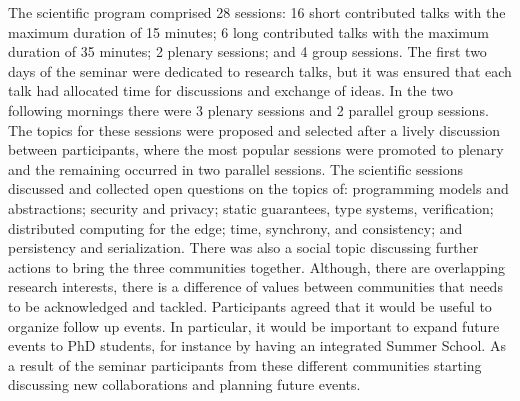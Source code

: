 \documentclass[a4paper,UKenglish]{dagrep-v2018}
\begin{document}
The scientific program comprised 28 sessions: 16 short contributed talks with the maximum duration of 15 minutes; 
6 long contributed talks with the maximum duration of 35 minutes; 2 plenary sessions; and 4 group sessions. 
The first two days of the seminar were dedicated to research talks, but it was ensured that each talk had  
allocated time for discussions and exchange of ideas. In the two following mornings there were 3 plenary sessions and 2 parallel group sessions.
The topics for these sessions were proposed and selected after a lively discussion between participants, 
where the most popular sessions were promoted to plenary and the remaining occurred in two parallel sessions.
The scientific sessions discussed and collected open questions on the topics of: programming models and abstractions; security and privacy; 
static guarantees, type systems, verification; distributed computing for the edge; time, synchrony, and consistency; and persistency and serialization. There was also a social topic discussing further actions to bring the three communities together. Although, there are overlapping research interests, there is a difference of values between communities that needs to be acknowledged and tackled. 
Participants agreed that it would be useful to organize follow up events. In particular, 
it would be important to expand future events to PhD students, for instance by having an integrated Summer School. 
As a result of the seminar participants from these different communities starting discussing new collaborations and planning future events.

\end{document}
